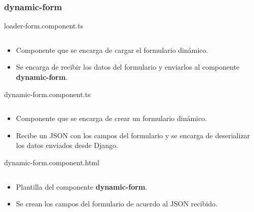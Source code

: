 \documentclass{article}
\newenvironment{block}{\captionsetup{type=listing}}{}
\begin{document}
\subsubsection{dynamic-form}
\begin{block}
	\caption{loader-form.component.ts}
	\inputminted{TypeScript}{kioskios_web/src/app/dinamic-form/loader-form/loader-form.component.ts}
	\begin{itemize}
		\item Componente que se encarga de cargar el formulario dinámico.
		\item Se encarga de recibir los datos del formulario y enviarlos al componente \textbf{dynamic-form}.
	\end{itemize}

	\caption{dynamic-form.component.ts}
	\inputminted[breaklines]{TypeScript}{kioskios_web/src/app/dinamic-form/dinamic-form.component.ts}
	\begin{itemize}
		\item Componente que se encarga de crear un formulario dinámico.
		\item Recibe un JSON con los campos del formulario y se encarga de deserializar los datos enviados desde Django.
	\end{itemize}

	\caption{dynamic-form.component.html}
	\inputminted[breaklines]{HTML}{kioskios_web/src/app/dinamic-form/dinamic-form.component.html}
	\begin{itemize}
		\item Plantilla del componente \textbf{dynamic-form}.
		\item Se crean los campos del formulario de acuerdo al JSON recibido.
	\end{itemize}
\end{block}
\end{document}
